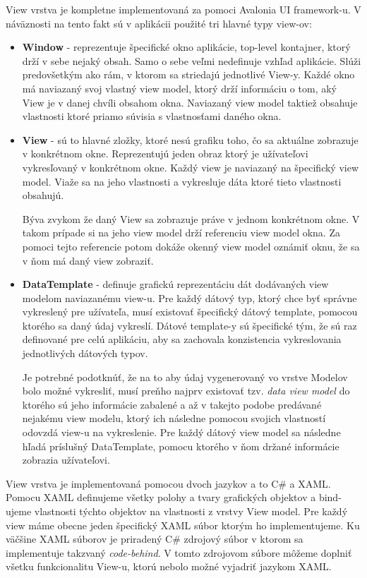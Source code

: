 View vrstva je kompletne implementovaná za pomoci Avalonia UI framework-u. V náväznosti na tento fakt sú v aplikácii použité tri hlavné typy view-ov:
\begin{itemize}
    \item \textbf{Window} - reprezentuje špecifické okno aplikácie, top-level kontajner, ktorý drží v sebe nejaký obsah. Samo o sebe veľmi nedefinuje vzhľad aplikácie. Slúži predovšetkým ako rám, v ktorom sa striedajú jednotlivé View-y. Každé okno má naviazaný svoj vlastný view model, ktorý drží informáciu o tom, aký View je v danej chvíli obsahom okna. Naviazaný view model taktiež obsahuje vlastnosti ktoré priamo súvisia s vlastnosťami daného okna.
    \item \textbf{View} - sú to hlavné zložky, ktoré nesú grafiku toho, čo sa aktuálne zobrazuje v konkrétnom okne. Reprezentujú jeden obraz ktorý je užívateľovi vykresľovaný v konkrétnom okne. Každý view je naviazaný na špecifický view model. Viaže sa na jeho vlastnosti a vykresluje dáta ktoré tieto vlastnosti obsahujú. 
    
    Býva zvykom že daný View sa zobrazuje práve v jednom konkrétnom okne. V takom prípade si na jeho view model drží referenciu view model okna. Za pomoci tejto referencie potom dokáže okenný view model oznámiť oknu, že sa v ňom má daný view zobraziť. 
    \item \textbf{DataTemplate} - definuje grafickú reprezentáciu dát dodávaných view modelom naviazanému view-u. Pre každý dátový typ, ktorý chce byť správne vykreslený pre užívateľa, musí existovať špecifický dátový template, pomocou ktorého sa daný údaj vykreslí. Dátové template-y sú špecifické tým, že sú raz definované pre celú aplikáciu, aby sa zachovala konzistencia vykreslovania jednotlivých dátových typov.
    
    Je potrebné podotknúť, že na to aby údaj vygenerovaný vo vrstve Modelov bolo možné vykresliť, musí preňho najprv existovať tzv. \textit{data view model} do ktorého sú jeho informácie zabalené a až v takejto podobe predávané nejakému view modelu, ktorý ich následne pomocou svojich vlastností odovzdá view-u na vykreslenie. Pre každý dátový view model sa následne hľadá príslušný DataTemplate, pomocu ktorého v ňom držané informácie zobrazia užívateľovi. 
\end{itemize}   

View vrstva je implementovaná pomocou dvoch jazykov a to C\# a XAML. Pomocu XAML definujeme všetky polohy a tvary grafických objektov a bind-ujeme vlastnosti týchto objektov na vlastnosti z vrstvy View model. Pre každý view máme obecne jeden špecifický XAML súbor ktorým ho implementujeme. Ku väčšine XAML súborov je priradený C\# zdrojový súbor v ktorom sa implementuje takzvaný \textit{code-behind}. V tomto zdrojovom súbore môžeme doplniť všetku funkcionalitu View-u, ktorú nebolo možné vyjadriť jazykom XAML.    

